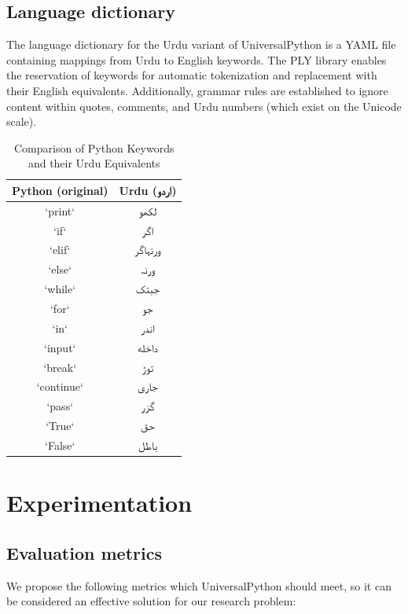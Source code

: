 \documentclass[conference]{IEEEtran}
\begin{document}
\subsection{Language dictionary}

The language dictionary for the Urdu variant of UniversalPython is a YAML file containing mappings from Urdu to English keywords. The PLY library enables the reservation of keywords for automatic tokenization and replacement with their English equivalents. Additionally, grammar rules are established to ignore content within quotes, comments, and Urdu numbers (which exist on the Unicode scale).

\begin{table}[h]
  \centering
  \caption{Comparison of Python Keywords and their Urdu Equivalents}
  \label{tab:python_urdu}
  \vspace{3mm}
\begin{tabular}{|c|c|}
\hline
Python (original) & Urdu (\texturdu{اردو}) \\
\hline
`print` & \texturdu{لکھو} \\
`if` & \texturdu{اگر} \\
`elif` & \texturdu{ورنہاگر} \\
`else` & \texturdu{ورنہ} \\
`while` & \texturdu{جبتک} \\
`for` & \texturdu{جو} \\
`in` & \texturdu{اندر} \\
`input` & \texturdu{داخله} \\
`break` & \texturdu{توڑ} \\
`continue` & \texturdu{جاری} \\
`pass` & \texturdu{گزر} \\
`True` & \texturdu{حق} \\
`False` & \texturdu{باطل} \\
\hline
\end{tabular}
\end{table}

\section{Experimentation}

\subsection{Evaluation metrics}\label{AA}

We propose the following metrics which UniversalPython should meet, so it can be considered an effective solution for our research problem:
\end{document}
